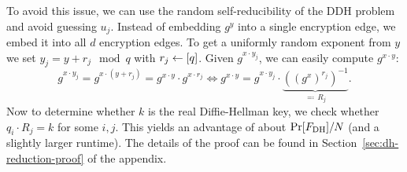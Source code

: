 To avoid this issue, we can use the random self-reducibility of the DDH problem and avoid guessing $u_j$. Instead of embedding $g^y$ into a single encryption edge, we embed it into all $d$ encryption edges. To get a uniformly random exponent from $y$ we set $y_j = y + r_j \mod q$ with $r_j \leftarrow [q]$. Given $g^{x \cdot y_j}$, we can easily compute $g^{x \cdot y}$:
\[
	g^{x \cdot y_j} = g^{x \cdot (y + r_j)} = g^{x \cdot y}	\cdot g^{x \cdot r_j} \iff g^{x \cdot y} = g^{x \cdot y_j} \cdot \underbrace{((g^x)^{r_j})^{-1}}_{\eqqcolon \, R_j}.
\]
Now to determine whether $k$ is the real Diffie-Hellman key, we check whether $q_i \cdot R_j = k$ for some $i, j$. This yields an advantage of about $\pr{\fdh} / N$ (and a slightly larger runtime). The details of the proof can be found in Section~\ref{sec:dh-reduction-proof} of the appendix.
